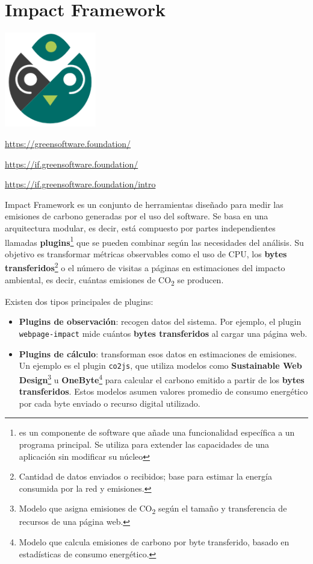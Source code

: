 \documentclass[12pt,a4paper]{report}
\begin{document}
\section*{Impact Framework}

\begin{center}
\includegraphics[width=0.3\textwidth]{imagenes/Impact_Logo.png}
\end{center}

\href{https://greensoftware.foundation/}{https://greensoftware.foundation/}

\href{https://if.greensoftware.foundation/}{https://if.greensoftware.foundation/}

\href{https://if.greensoftware.foundation/intro}{https://if.greensoftware.foundation/intro}

Impact Framework es un conjunto de herramientas diseñado para medir las
emisiones de carbono generadas por el uso del software. Se basa en una
arquitectura modular, es decir, está compuesto por partes independientes
llamadas \textbf{plugins}\footnote{es un componente de software que añade una funcionalidad específica a un programa principal. Se utiliza para extender las capacidades de una aplicación sin modificar su núcleo} que se pueden combinar según las necesidades del análisis. Su
objetivo es transformar métricas observables como el uso de CPU, los
\textbf{bytes transferidos}\footnote{Cantidad de datos enviados o recibidos;
  base para estimar la energía consumida por la red y emisiones.} o el número de
visitas a páginas en estimaciones del impacto ambiental, es decir, cuántas
emisiones de CO\textsubscript{2} se producen.

Existen dos tipos principales de plugins:

\begin{itemize}
  \item \textbf{Plugins de observación}: recogen datos del sistema. Por ejemplo, el plugin \texttt{webpage-impact} mide cuántos \textbf{bytes transferidos} al cargar una página web.
  \item \textbf{Plugins de cálculo}: transforman esos datos en estimaciones de emisiones. Un ejemplo es el plugin \texttt{co2js}, que utiliza modelos como \textbf{Sustainable Web Design}\footnote{Modelo que asigna emisiones de CO\textsubscript{2} según el tamaño y transferencia de recursos de una página web.} u \textbf{OneByte}\footnote{Modelo que calcula emisiones de carbono por byte transferido, basado en estadísticas de consumo energético.} para calcular el carbono emitido a partir de los \textbf{bytes transferidos}. Estos modelos asumen valores promedio de consumo energético por cada byte enviado o recurso digital utilizado.
\end{itemize}
\end{document}
